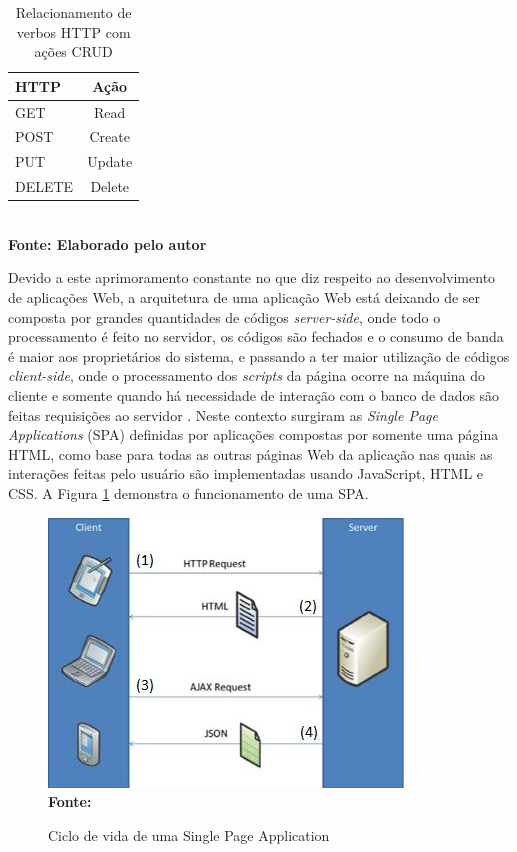 \begin{table}[htb]
	\centering
	\caption{\hspace{0.1cm} Relacionamento de verbos HTTP com ações CRUD}
	\vspace{-0.3cm} %
	\label{tab:tabela1}
	\begin{tabular}{l|c}
  \hline
    \textbf{HTTP} & \textbf{Ação} \\
    \hline
      GET & Read \\
      POST & Create \\
      PUT & Update \\
      DELETE & Delete \\
     \hline
 \end{tabular}
 	\vspace{.1cm}  %
	\small
	{\footnotesize\\ \textbf{Fonte: Elaborado pelo autor}}
\end{table}

Devido a este aprimoramento constante no que diz respeito ao desenvolvimento de aplicações Web, a arquitetura de uma aplicação Web está deixando 
de ser composta por grandes quantidades de códigos \textit{server-side}, onde todo o processamento é feito no servidor, os códigos são fechados e 
o consumo de banda é maior aos proprietários do sistema, e passando a ter maior utilização de códigos \textit{client-side}, onde o processamento dos 
\textit{scripts} da página ocorre na máquina do cliente e somente quando há necessidade de interação com o banco de dados são feitas requisições ao 
servidor \cite{spa01}. Neste contexto surgiram as \textit{Single Page Applications} (SPA) definidas por \cite{spa02} aplicações compostas por somente 
uma página HTML, como base para todas as outras páginas Web da aplicação nas quais as interações feitas pelo usuário são implementadas usando 
JavaScript, HTML e CSS. A Figura \ref{fig:spa} demonstra o funcionamento de uma SPA.

\begin{figure}[!ht]
	\centering	
	\caption[\hspace{0.1cm} Ciclo de vida de uma Single Page Application.]{Ciclo de vida de uma Single Page Application}
	  \vspace{-0.4cm}
	\includegraphics[width=.6\textwidth]{figuras/spa.png}
	 \vspace{-0.3cm}
	\\\textbf{\footnotesize Fonte: \cite{spa02}}
	\label{fig:spa}
\end{figure}

